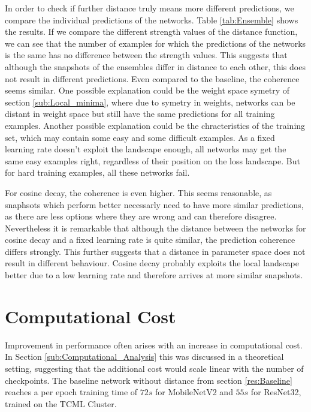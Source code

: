 In order to check if further distance truly means more different predictions, we
compare the individual predictions of the networks. Table \ref{tab:Ensemble}
shows the results. If we compare the different strength values of the distance
function, we can see that the number of examples for which the predictions of
the networks is the same has no difference between the strength values. This
suggests that although the snapshots of the ensembles differ in distance to each
other, this does not result in different predictions. Even compared to the
baseline, the coherence seems similar. One possible explanation could be the
weight space symetry of section \ref{sub:Local_minima}, where due to symetry in
weights, networks can be distant in weight space but still have the same
predictions for all training examples. Another possible explanation could be the
chracteristics of the training set, which may contain some easy and some
difficult examples. As a fixed learning rate doesn't exploit the landscape
enough, all networks may get the same easy examples right, regardless of their
position on the loss landscape. But for hard training examples, all these
networks fail.


For cosine decay, the coherence is even higher. This seems reasonable, as
snaphsots which perform better necessarly need to have more similar predictions,
as there are less options where they are wrong and can therefore disagree.
Nevertheless it is remarkable that although the distance between the networks
for cosine decay and a fixed learning rate is quite similar, the prediction
coherence differs strongly. This further suggests that a distance in parameter
space does not result in different behaviour. Cosine decay probably exploits the
local landscape better due to a low learning rate and therefore arrives at more
similar snapshots.


\section{Computational Cost}\label{Res:Computational_cost}

Improvement in performance often arises with an increase in computational cost.
In Section \ref{sub:Computational_Analysis} this was discussed in a theoretical
setting, suggesting that the additional cost would scale linear with the number
of checkpoints. The baseline network without distance from section
\ref{res:Baseline} reaches a per epoch training time of $72s$ for MobileNetV2 and
$55s$ for ResNet32, trained on the TCML Cluster. 


